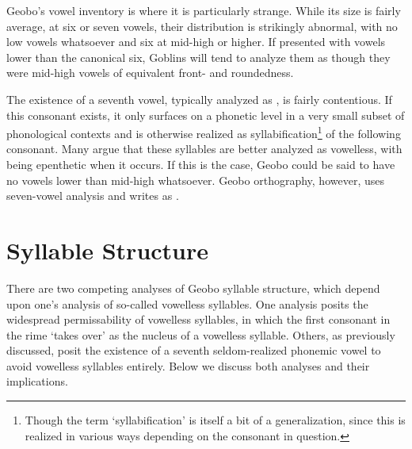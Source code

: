 \documentclass[a4paper,11pt,oneside,openany]{memoir}
\begin{document}
Geobo\engma's vowel inventory is where it is particularly strange. While its size is fairly average, at six or seven vowels, their distribution is strikingly abnormal, with no low vowels whatsoever and six at mid-high or higher. If presented with vowels lower than the canonical six, Goblins will tend to analyze them as though they were mid-high vowels of equivalent front- and roundedness. 

The existence of a seventh vowel, typically analyzed as \phipa{\schwa}, is fairly contentious. If this consonant exists, it only surfaces on a phonetic level in a very small subset of phonological contexts and is otherwise realized as syllabification\footnote{Though the term `syllabification' is itself a bit of a generalization, since this is realized in various ways depending on the consonant in question.} of the following consonant. 
Many argue that these syllables are better analyzed as vowelless, with \bripa{\schwa} being epenthetic when it occurs. If this is the case, Geobo\engma{} could be said to have no vowels lower than mid-high whatsoever. Geobo\engma{} orthography, however, uses seven-vowel analysis and writes \phipa{\schwa} as .


\section{Syllable Structure}

There are two competing analyses of Geobo\engma{} syllable structure, which depend upon one's analysis of so-called vowelless syllables. One analysis posits the widespread permissability of vowelless syllables, in which the first consonant in the rime `takes over' as the nucleus of a vowelless syllable. Others, as previously discussed, posit the existence of a seventh seldom-realized phonemic vowel \phipa{\schwa} to avoid vowelless syllables entirely. Below we discuss both analyses and their implications.
\end{document}

